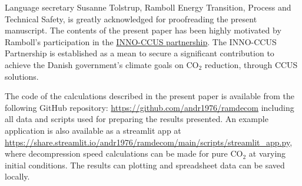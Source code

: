 \documentclass[a4paper, 10pt, twocolumn, twoside]{scrartcl}
\begin{document}
\Acknowledgement
Language secretary Susanne Tolstrup, Ramboll Energy Transition, Process and Technical Safety, is greatly acknowledged for proofreading the present manuscript. The contents of the present paper has been highly motivated by Ramboll's participation in the \href{https://inno-ccus.dk/}{INNO-CCUS partnership}.
The INNO-CCUS Partnership is established as a mean to secure a significant contribution to achieve the Danish government's climate goals on CO$_2$ reduction, through CCUS solutions.





\Appendix
The code of the calculations described in the present paper is available from the following GitHub repository: \url{https://github.com/andr1976/ramdecom} including all data and scripts used for preparing the results presented. An example application is also available as a streamlit app at \url{https://share.streamlit.io/andr1976/ramdecom/main/scripts/streamlit_app.py}, where decompression speed calculations can be made for pure CO$_2$ at varying initial conditions. The results can plotting and spreadsheet data can be saved locally.
\end{document}
